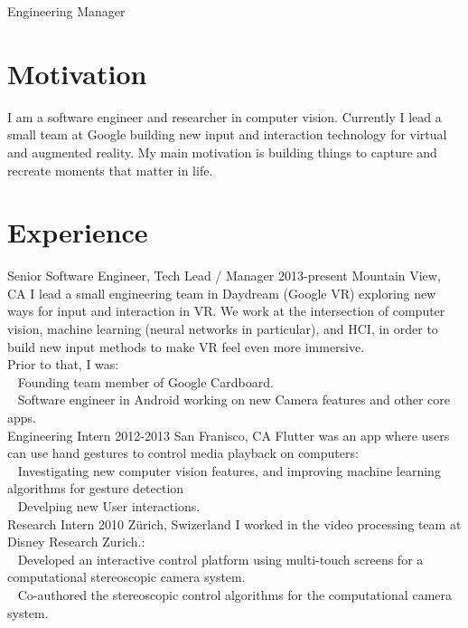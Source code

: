 \documentclass{kaeserchen_cv}
\begin{document}
\thispagestyle{empty}
\subtitle{Software Engineer}{Engineering Manager}


\section{Motivation}
I am a software engineer and researcher in computer vision. Currently I lead a small team at Google building new input and interaction technology for virtual and augmented reality. My main motivation is building things to capture and recreate moments that matter in life.

\section{Experience}
                {Senior Software Engineer, Tech Lead / Manager}
	        {2013-present}
	        {Mountain View, CA}
	        {I lead a small engineering team in Daydream (Google VR) exploring 
		 new ways for input and interaction in VR. We work at the 
		 intersection of computer vision, machine learning (neural networks
         	 in particular), and HCI, in order to build new input methods to 
		 make VR feel even more immersive. \\
		 \newline
		 Prior to that, I was: \\
	         \textbullet ~ Founding team member of Google Cardboard. \\
                 \textbullet ~ Software engineer in Android working on new Camera features and other core apps. \\
		 }
\newline
{}
                {Engineering Intern}
	        {2012-2013}
	        {San Franisco, CA}
	        {Flutter was an app where users can use hand gestures to control media playback on computers: \\
                 \textbullet ~ Investigating new computer vision features, and 
		               improving machine learning algorithms for gesture detection \\
                 \textbullet ~ Develping new User interactions. \\}
\newline
{}
                {Research Intern}
	        {2010}
	        {Z\"urich, Swizerland}
	        {I worked in the video processing team at Disney Research Zurich.: \\
                 \textbullet ~ Developed an interactive control platform using 
		               multi-touch screens for a computational stereoscopic camera system. \\
                 \textbullet ~ Co-authored the stereoscopic control algorithms for the 
		               computational camera system.}
\end{document}
